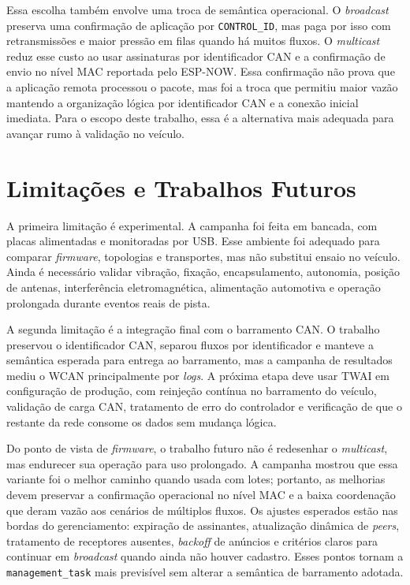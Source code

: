 Essa escolha também envolve uma troca de semântica operacional. O \emph{broadcast}
preserva uma confirmação de aplicação por \texttt{CONTROL\_ID}, mas paga por isso com retransmissões e maior pressão em filas
quando há muitos fluxos. O \emph{multicast} reduz esse custo ao usar assinaturas
por identificador CAN e a confirmação de envio no nível MAC reportada pelo ESP-NOW. Essa
confirmação não prova que a aplicação remota processou o pacote, mas foi a troca
que permitiu maior vazão mantendo a organização lógica por identificador CAN e a conexão
inicial imediata. Para o escopo deste trabalho, essa é a alternativa mais
adequada para avançar rumo à validação no veículo.

\section{Limitações e Trabalhos Futuros}

A primeira limitação é experimental. A campanha foi feita em bancada, com placas
alimentadas e monitoradas por USB. Esse ambiente foi adequado para comparar
\emph{firmware}, topologias e transportes, mas não substitui ensaio no veículo. Ainda é
necessário validar vibração, fixação, encapsulamento, autonomia, posição de
antenas, interferência eletromagnética, alimentação automotiva e operação
prolongada durante eventos reais de pista.

A segunda limitação é a integração final com o barramento CAN. O trabalho preservou o identificador CAN,
separou fluxos por identificador e manteve a semântica esperada para entrega ao
barramento, mas a campanha de resultados mediu o WCAN principalmente por \emph{logs}. A
próxima etapa deve usar TWAI em configuração de produção, com reinjeção contínua
no barramento do veículo, validação de carga CAN, tratamento de erro do
controlador e verificação de que o restante da rede consome os dados sem mudança
lógica.

Do ponto de vista de \emph{firmware}, o trabalho futuro não é redesenhar o \emph{multicast},
mas endurecer sua operação para uso prolongado. A campanha mostrou que essa
variante foi o melhor caminho quando usada com lotes; portanto, as melhorias devem
preservar a confirmação operacional no nível MAC e a baixa coordenação que deram
vazão aos cenários de múltiplos fluxos. Os ajustes esperados estão nas bordas do
gerenciamento: expiração de assinantes, atualização dinâmica de \emph{peers}, tratamento
de receptores ausentes, \emph{backoff} de anúncios e critérios claros para continuar em
\emph{broadcast} quando ainda não houver cadastro. Esses pontos tornam a
\texttt{management\_task} mais previsível sem alterar a semântica de barramento
adotada.


